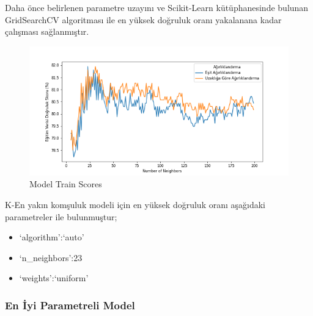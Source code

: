 \documentclass[12pt,twoside]{deuthesis}
\providecommand{\tightlist}{%
  \setlength{\itemsep}{0pt}\setlength{\parskip}{0pt}}
\begin{document}
Daha önce belirlenen parametre uzayını ve Scikit-Learn kütüphanesinde bulunan GridSearchCV algoritması ile en yüksek doğruluk oranı yakalanana kadar çalışması sağlanmıştır.
\begin{figure}

{\centering \includegraphics[width=1.1\linewidth,height=0.55\textheight]{figure/KNN_bin_Grid_Graph} 

}

\caption{Model Train Scores}\label{fig:unnamed-chunk-47}
\end{figure}
\newpage

K-En yakın komşuluk modeli için en yüksek doğruluk oranı aşağıdaki parametreler ile bulunmuştur;
\begin{itemize}
\tightlist
\item
  `algorithm':`auto'\\
\item
  `n\_neighbors':23\\
\item
  `weights':`uniform'
\end{itemize}
\hypertarget{en-iyi-parametreli-model-2}{%
\subsubsection{En İyi Parametreli Model}\label{en-iyi-parametreli-model-2}}
\end{document}
